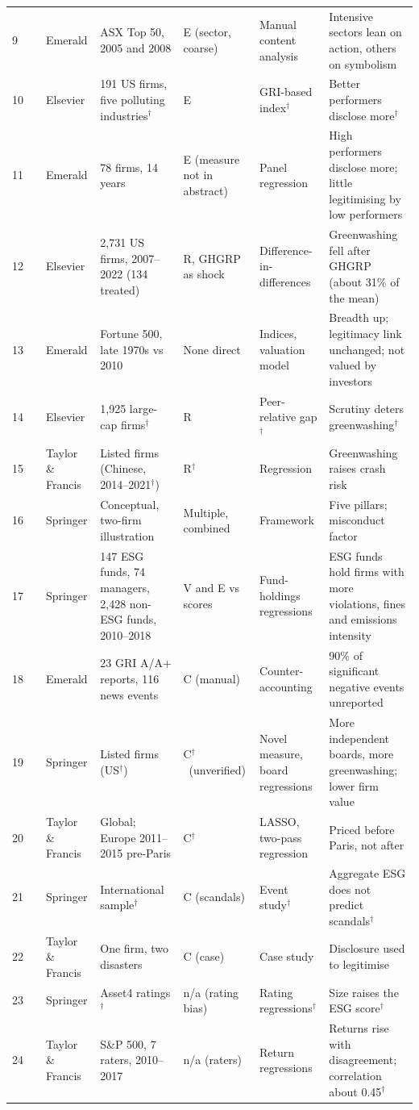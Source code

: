 \documentclass[12pt,a4paper]{article}
\newcommand{\dg}{$^{\dagger}$}          %
\begin{document}
{\begin{longtable}{@{}L{0.5cm}L{2.2cm}L{1.5cm}L{2.9cm}L{1.3cm}L{2.2cm}L{3.8cm}@{}}
9 & \citet{hrasky2012} & Emerald & ASX Top 50, 2005 and 2008 & E (sector, coarse) & Manual content analysis & Intensive sectors lean on action, others on symbolism\\
10 & \citet{clarkson2008} & Elsevier & 191 US firms, five polluting industries\dg & E & GRI-based index\dg & Better performers disclose more\dg\\
11 & \citet{tadros2019} & Emerald & 78 firms, 14 years & E (measure not in abstract) & Panel regression & High performers disclose more; little legitimising by low performers\\
12 & \citet{luu2025} & Elsevier & 2,731 US firms, 2007--2022 (134 treated) & R, GHGRP as shock & Difference-in-differences & Greenwashing fell after GHGRP (about 31\% of the mean)\\
13 & \citet{cho2015} & Emerald & Fortune 500, late 1970s vs 2010 & None direct & Indices, valuation model & Breadth up; legitimacy link unchanged; not valued by investors\\
14 & \citet{yu2020} & Elsevier & 1,925 large-cap firms\dg & R & Peer-relative gap\dg & Scrutiny deters greenwashing\dg\\
15 & \citet{liu2024} & Taylor \& Francis & Listed firms (Chinese, 2014--2021\dg) & R\dg & Regression & Greenwashing raises crash risk\\
16 & \citet{dorfleitner2024} & Springer & Conceptual, two-firm illustration & Multiple, combined & Framework & Five pillars; misconduct factor\\
17 & \citet{raghunandan2022} & Springer & 147 ESG funds, 74 managers, 2,428 non-ESG funds, 2010--2018 & V and E vs scores & Fund-holdings regressions & ESG funds hold firms with more violations, fines and emissions intensity\\
18 & \citet{boiral2013} & Emerald & 23 GRI A/A+ reports, 116 news events & C (manual) & Counter-accounting & 90\% of significant negative events unreported\\
19 & \citet{ghitti2024} & Springer & Listed firms (US\dg) & C\dg\ (unverified) & Novel measure, board regressions & More independent boards, more greenwashing; lower firm value\\
20 & \citet{bacher2025} & Taylor \& Francis & Global; Europe 2011--2015 pre-Paris & C\dg & LASSO, two-pass regression & Priced before Paris, not after\\
21 & \citet{utz2019} & Springer & International sample\dg & C (scandals) & Event study\dg & Aggregate ESG does not predict scandals\dg\\
22 & \citet{cho2009} & Taylor \& Francis & One firm, two disasters & C (case) & Case study & Disclosure used to legitimise\\
23 & \citet{drempetic2020} & Springer & Asset4 ratings\dg & n/a (rating bias) & Rating regressions\dg & Size raises the ESG score\dg\\
24 & \citet{gibsonbrandon2021} & Taylor \& Francis & S\&P 500, 7 raters, 2010--2017 & n/a (raters) & Return regressions & Returns rise with disagreement; correlation about 0.45\dg\\
\end{longtable}
}
\end{document}
